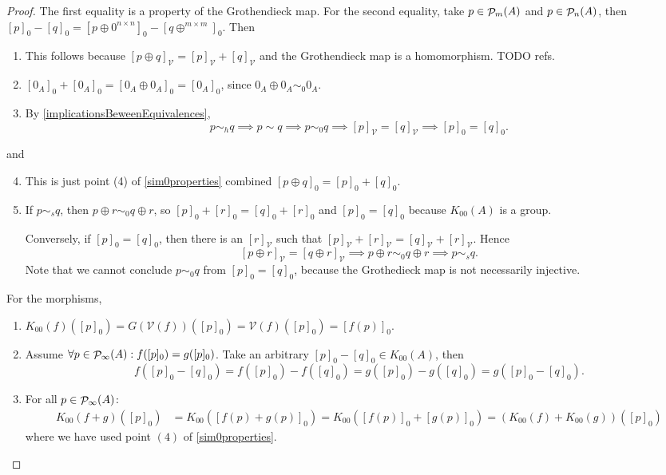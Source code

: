\begin{proof}
The first equality is a property of the Grothendieck map. For the second equality, take $p\in\mathop{\mathcal{P}}\nolimits_m(A)$ and $p\in\mathop{\mathcal{P}}\nolimits_n(A)$, then $[p]_0 - [q]_0 = [p\oplus 0^{n\times n}]_0 - [q \oplus^{m\times m}]_0$.
Then
\begin{enumerate}
\item This follows because $[p\oplus q]_\mathcal{V} = [p]_\mathcal{V} + [q]_\mathcal{V}$ and the Grothendieck map is a homomorphism. TODO refs.
\item $[0_A]_0+[0_A]_0 = [0_A\oplus 0_A]_0 = [0_A]_0$, since $0_A\oplus 0_A \sim_0 0_A$.
\item By \ref{implicationsBeweenEquivalences},
\[ p\sim_h q \implies p\sim q \implies p\sim_0 q \implies [p]_\mathcal{V} = [q]_\mathcal{V} \implies [p]_0 = [q]_0. \]
\end{enumerate}
and
\begin{enumerate}
\setcounter{enumi}{3}
\item This is just point (4) of \ref{sim0properties} combined $[p\oplus q]_0 = [p]_0+[q]_0$.
\item If $p\sim_s q$, then $p\oplus r \sim_0 q\oplus r$, so $[p]_0 +[r]_0 = [q]_0 + [r]_0$ and $[p]_0 = [q]_0$ because $K_{00}(A)$ is a group.

Conversely, if $[p]_0 = [q]_0$, then there is an $[r]_\mathcal{V}$ such that $[p]_\mathcal{V} + [r]_\mathcal{V} = [q]_\mathcal{V} + [r]_\mathcal{V}$. Hence
\[ [p\oplus r]_\mathcal{V} = [q\oplus r]_\mathcal{V} \implies p\oplus r \sim_0 q\oplus r \implies p\sim_s q. \]
Note that we cannot conclude $p \sim_0 q$ from $[p]_0 = [q]_0$, because the Grothedieck map is not necessarily injective.
\end{enumerate}
For the morphisms,
\begin{enumerate}
\item $K_{00}(f)([p]_0) = G(\mathcal{V}(f))([p]_0) = \mathcal{V}(f)([p]_0) = [f(p)]_0$.
\item Assume $ \forall p\in\mathop{\mathcal{P}}\nolimits_\infty(A): f([p]_0) = g([p]_0)$. Take an arbitrary $[p]_0-[q]_0\in K_{00}(A)$, then
\[ f([p]_0-[q]_0) = f([p]_0)-f([q]_0) = g([p]_0)-g([q]_0) = g([p]_0-[q]_0). \]
\item For all $p\in\mathop{\mathcal{P}}\nolimits_\infty(A)$:
\begin{align*}
K_{00}(f + g)([p]_0) &= K_{00}([f(p) + g(p)]_0) = K_{00}([f(p)]_0 + [g(p)]_0) =  (K_{00}(f) + K_{00}(g))([p]_0)
\end{align*}
where we have used point $(4)$ of \ref{sim0properties}.
\end{enumerate}
\end{proof}


